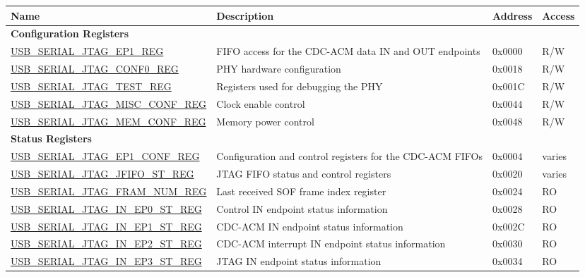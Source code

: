 \begin{longtable}{ | p{6cm} | p{7.2cm} | p{1.3cm} | p{1cm} | }
\hline\rowcolor{lightgray}
Name & Description &  Address & Access \\ \hline
\endhead
\multicolumn{4}{|l|}{\textbf{Configuration Registers}} \\ \hline
\hyperref[regdesc:USBSERIALJTAGEP1REG]{USB\_SERIAL\_JTAG\_EP1\_REG} & FIFO access for the CDC-ACM data IN and OUT endpoints & 0x0000 & R/W \\ \hline
\hyperref[regdesc:USBSERIALJTAGCONF0REG]{USB\_SERIAL\_JTAG\_CONF0\_REG} & PHY hardware configuration & 0x0018 & R/W \\ \hline
\hyperref[regdesc:USBSERIALJTAGTESTREG]{USB\_SERIAL\_JTAG\_TEST\_REG} & Registers used for debugging the PHY & 0x001C & R/W \\ \hline
\hyperref[regdesc:USBSERIALJTAGMISCCONFREG]{USB\_SERIAL\_JTAG\_MISC\_CONF\_REG} & Clock enable control & 0x0044 & R/W \\ \hline
\hyperref[regdesc:USBSERIALJTAGMEMCONFREG]{USB\_SERIAL\_JTAG\_MEM\_CONF\_REG} & Memory power control & 0x0048 & R/W \\ \hline
\multicolumn{4}{|l|}{\textbf{Status Registers}} \\ \hline
\hyperref[regdesc:USBSERIALJTAGEP1CONFREG]{USB\_SERIAL\_JTAG\_EP1\_CONF\_REG} & Configuration and control registers for the CDC-ACM FIFOs & 0x0004 & varies \\ \hline
\hyperref[regdesc:USBSERIALJTAGJFIFOSTREG]{USB\_SERIAL\_JTAG\_JFIFO\_ST\_REG} & JTAG FIFO status and control registers & 0x0020 & varies \\ \hline
\hyperref[regdesc:USBSERIALJTAGFRAMNUMREG]{USB\_SERIAL\_JTAG\_FRAM\_NUM\_REG} & Last received SOF frame index register & 0x0024 & RO \\ \hline
\hyperref[regdesc:USBSERIALJTAGINEP0STREG]{USB\_SERIAL\_JTAG\_IN\_EP0\_ST\_REG} & Control IN endpoint status information & 0x0028 & RO \\ \hline
\hyperref[regdesc:USBSERIALJTAGINEP1STREG]{USB\_SERIAL\_JTAG\_IN\_EP1\_ST\_REG} & CDC-ACM IN endpoint status information & 0x002C & RO \\ \hline
\hyperref[regdesc:USBSERIALJTAGINEP2STREG]{USB\_SERIAL\_JTAG\_IN\_EP2\_ST\_REG} & CDC-ACM interrupt IN endpoint status information & 0x0030 & RO \\ \hline
\hyperref[regdesc:USBSERIALJTAGINEP3STREG]{USB\_SERIAL\_JTAG\_IN\_EP3\_ST\_REG} & JTAG IN endpoint status information & 0x0034 & RO \\ \hline

\end{longtable}
